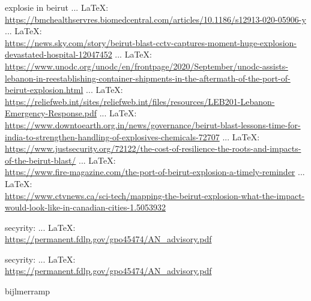 \begin{thebibliography}{99}
{{{	
	explosie in beirut
	 ... \LaTeX:\\ \url{https://bmchealthservres.biomedcentral.com/articles/10.1186/s12913-020-05906-y}
	 ... \LaTeX:\\ \url{https://news.sky.com/story/beirut-blast-cctv-captures-moment-huge-explosion-devastated-hospital-12047452}
	 ... \LaTeX:\\ \url{https://www.unodc.org/unodc/en/frontpage/2020/September/unodc-assists-lebanon-in-reestablishing-container-shipments-in-the-aftermath-of-the-port-of-beirut-explosion.html}
	 ... \LaTeX:\\ \url{https://reliefweb.int/sites/reliefweb.int/files/resources/LEB201-Lebanon-Emergency-Response.pdf}
	 ... \LaTeX:\\ \url{https://www.downtoearth.org.in/news/governance/beirut-blast-lessons-time-for-india-to-strengthen-handling-of-explosives-chemicals-72707}
	 ... \LaTeX:\\ \url{https://www.justsecurity.org/72122/the-cost-of-resilience-the-roots-and-impacts-of-the-beirut-blast/}
	 ... \LaTeX:\\ \url{https://www.fire-magazine.com/the-port-of-beirut-explosion-a-timely-reminder}
	 ... \LaTeX:\\ \url{https://www.ctvnews.ca/sci-tech/mapping-the-beirut-explosion-what-the-impact-would-look-like-in-canadian-cities-1.5053932}
	
	
	secyrity:
	 ... \LaTeX:\\ \url{https://permanent.fdlp.gov/gpo45474/AN_advisory.pdf}
	
	
	secyrity:
	 ... \LaTeX:\\ \url{https://permanent.fdlp.gov/gpo45474/AN_advisory.pdf}
	
	
	
	
	
	
	
	
	bijlmerramp
	
	
	
}}}
\end{thebibliography}
